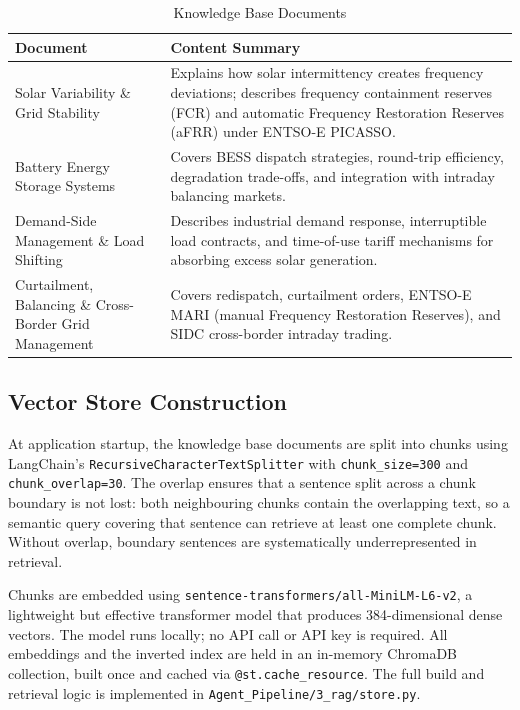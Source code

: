 \documentclass[12pt, a4paper]{article}
\begin{document}
\begin{table}[H]
    \centering
    \caption{Knowledge Base Documents}
    \begin{tabularx}{\textwidth}{lX}
        \toprule
        \textbf{Document} & \textbf{Content Summary} \\
        \midrule
        Solar Variability \& Grid Stability & Explains how solar intermittency creates frequency deviations; describes frequency containment reserves (FCR) and automatic Frequency Restoration Reserves (aFRR) under ENTSO-E PICASSO. \\
        Battery Energy Storage Systems & Covers BESS dispatch strategies, round-trip efficiency, degradation trade-offs, and integration with intraday balancing markets. \\
        Demand-Side Management \& Load Shifting & Describes industrial demand response, interruptible load contracts, and time-of-use tariff mechanisms for absorbing excess solar generation. \\
        Curtailment, Balancing \& Cross-Border Grid Management & Covers redispatch, curtailment orders, ENTSO-E MARI (manual Frequency Restoration Reserves), and SIDC cross-border intraday trading. \\
        \bottomrule
    \end{tabularx}
\end{table}

\subsection{Vector Store Construction}

At application startup, the knowledge base documents are split into chunks using LangChain's \texttt{RecursiveCharacterTextSplitter} with \texttt{chunk\_size=300} and \texttt{chunk\_overlap=30}. The overlap ensures that a sentence split across a chunk boundary is not lost: both neighbouring chunks contain the overlapping text, so a semantic query covering that sentence can retrieve at least one complete chunk. Without overlap, boundary sentences are systematically underrepresented in retrieval.

Chunks are embedded using \texttt{sentence-transformers/all-MiniLM-L6-v2}, a lightweight but effective transformer model that produces 384-dimensional dense vectors. The model runs locally; no API call or API key is required. All embeddings and the inverted index are held in an in-memory ChromaDB collection, built once and cached via \texttt{@st.cache\_resource}. The full build and retrieval logic is implemented in \texttt{Agent\_Pipeline/3\_rag/store.py}.
\end{document}
